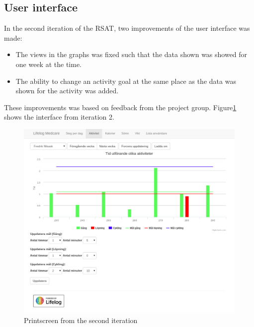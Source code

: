 \documentclass{cslthse-msc}
\begin{document}
\subsection{User interface}

In the second iteration of the RSAT, two improvements of the user interface was made:

\begin{itemize}
\item The views in the graphs was fixed such that the data shown was showed for one week at the time. 
\item The ability to change an activity goal at the same place as the data was shown for the activity was added.
\end{itemize}

These improvements was based on feedback from the project group. Figure\ref{fig:second-screen} shows the interface from iteration 2.





\begin{figure}[!hbt]
\centering
\includegraphics[scale=0.4]{seceenshot-second-version.pdf} 
\caption{Printscreen from the second iteration}\label{fig:second-screen}
\end{figure}
\end{document}
